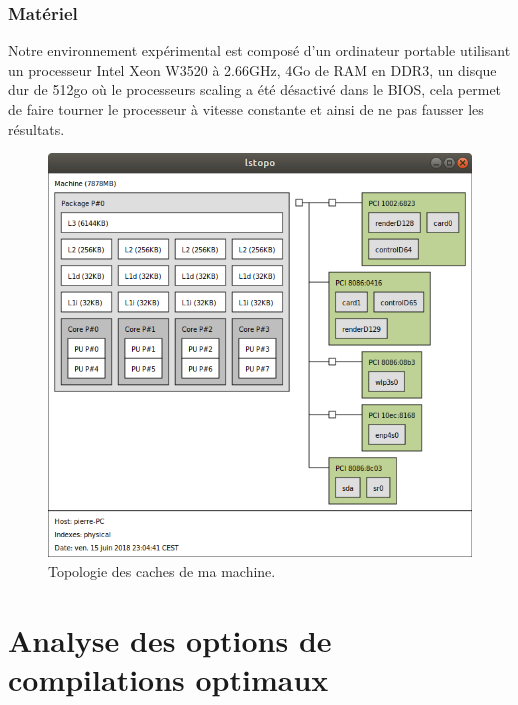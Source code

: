 \documentclass[
 aip,
 jmp,
 amsmath,amssymb,
 reprint
]{revtex4-1}
\begin{document}
\subsubsection{Matériel}
Notre environnement expérimental est composé d'un ordinateur portable utilisant un processeur Intel Xeon W3520 à 2.66GHz, 4Go de RAM en DDR3, un disque dur de 512go où le processeurs scaling a été désactivé dans le BIOS, cela permet de faire tourner le processeur à vitesse constante et ainsi de ne pas fausser les résultats.

\begin{figure}[H]
  \includegraphics[width=\linewidth, keepaspectratio=true]{caches.png}
  \caption{Topologie des caches de ma machine.\label{Fig:caches}}
\end{figure}

\section{Analyse des options de compilations optimaux}
\end{document}
